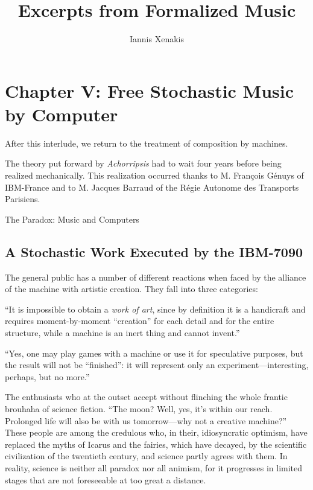 \documentclass[letterpaper, 11pt]{article}
\title{Excerpts from Formalized Music}
\author{Iannis Xenakis}
\date{}
\begin{document}
\maketitle

\section*{Chapter V: Free Stochastic Music by Computer}

After this interlude, we return to the treatment of composition by machines.

The theory put forward by \textit{Achorripsis} had to wait four years before being realized
mechanically. This realization occurred thanks to M. François Génuys of IBM-France and to M. Jacques
Barraud of the Régie Autonome des Transports Parisiens.

\begin{center}
    \Large The Paradox: Music and Computers
\end{center}

\subsection*{A Stochastic Work Executed by the IBM-7090}

The general public has a number of different reactions when faced by the alliance of the machine
with artistic creation. They fall into three categories:

``It is impossible to obtain a \textit{work of art}, since by definition it is a handicraft and
requires moment-by-moment ``creation'' for each detail and for the entire structure, while a machine
is an inert thing and cannot invent.''

``Yes, one may play games with a machine or use it for speculative purposes, but the result will not
be ``finished'': it will represent only an experiment---interesting, perhaps, but no more.''

The enthusiasts who at the outset accept without flinching the whole frantic brouhaha of science
fiction. ``The moon? Well, yes, it's within our reach. Prolonged life will also be with us
tomorrow---why not a creative machine?'' These people are among the credulous who, in their,
idiosyncratic optimism, have replaced the myths of Icarus and the fairies, which have decayed, by
the scientific civilization of the twentieth century, and science partly agrees with them. In
reality, science is neither all paradox nor all animism, for it progresses in limited stages that
are not foreseeable at too great a distance.
\end{document}
